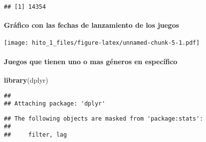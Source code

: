\documentclass[
]{article}
\newenvironment{Shaded}{\begin{snugshade}}{\end{snugshade}}
\newcommand{\AttributeTok}[1]{\textcolor[rgb]{0.13,0.29,0.53}{#1}}
\newcommand{\FunctionTok}[1]{\textcolor[rgb]{0.13,0.29,0.53}{\textbf{#1}}}
\newcommand{\NormalTok}[1]{#1}
\newcommand{\OtherTok}[1]{\textcolor[rgb]{0.56,0.35,0.01}{#1}}
\newcommand{\SpecialCharTok}[1]{\textcolor[rgb]{0.81,0.36,0.00}{\textbf{#1}}}
\newcommand{\StringTok}[1]{\textcolor[rgb]{0.31,0.60,0.02}{#1}}
\begin{document}
\begin{verbatim}
## [1] 14354
\end{verbatim}

\hypertarget{gruxe1fico-con-las-fechas-de-lanzamiento-de-los-juegos}{%
\paragraph{Gráfico con las fechas de lanzamiento de los
juegos}\label{gruxe1fico-con-las-fechas-de-lanzamiento-de-los-juegos}}

\begin{Shaded}
\end{Shaded}

\texttt{[image: hito\_1\_files/figure-latex/unnamed-chunk-5-1.pdf]}

\hypertarget{juegos-que-tienen-uno-o-mas-guxe9neros-en-especuxedfico}{%
\paragraph{Juegos que tienen uno o mas géneros en
específico}\label{juegos-que-tienen-uno-o-mas-guxe9neros-en-especuxedfico}}

\begin{Shaded}
\begin{Highlighting}[]
\FunctionTok{library}\NormalTok{(dplyr)}
\end{Highlighting}
\end{Shaded}

\begin{verbatim}
## 
## Attaching package: 'dplyr'
\end{verbatim}

\begin{verbatim}
## The following objects are masked from 'package:stats':
## 
##     filter, lag
\end{verbatim}
\end{document}

